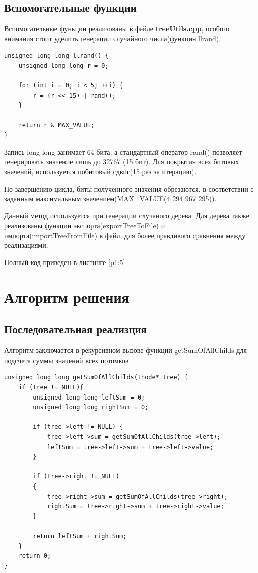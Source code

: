 \subsection{Вспомогательные функции}
Вспомогательные функции реализованы в файле \textbf{treeUtils.cpp}, особого внимания стоит уделить генерации случайного числа(функция llrand).
\begin{lstlisting}[firstnumber=17,language={}, caption=Отрывок TreeUtils.cpp]
unsigned long long llrand() {
	unsigned long long r = 0;

	for (int i = 0; i < 5; ++i) {
		r = (r << 15) | rand(); 
	}

	return r & MAX_VALUE;
}
\end{lstlisting}
Запись long long занимает 64 бита, а стандартный оператор rand() позволяет генерировать значение лишь до 32767 (15 бит). Для покрытия всех битовых значений, используется побитовый сдвиг(15 раз за итерацию).

По завершению цикла, биты полученного значения обрезаются, в соответствии с заданным максимальным значением(MAX\_VALUE(4 294 967 295)).

Данный метод используется при генерации случаного дерева. Для дерева также реализованы функции экспорта(exportTreeToFile) и импорта(importTreeFromFile) в файл, для более правдивого сравнения между реализациями.

Полный код приведен в листинге \ref{p1:5}.




\section{Алгоритм решения}
\subsection{Последовательная реализция}
Алгоритм заключается в рекурсивном вызове функции getSumOfAllChilds для подсчета суммы значений всех потомков.
\begin{lstlisting}[firstnumber=118,language={}, caption=Отрывок TreeUtils.cpp]
unsigned long long getSumOfAllChilds(tnode* tree) {
	if (tree != NULL){
		unsigned long long leftSum = 0;
		unsigned long long rightSum = 0;

		if (tree->left != NULL) {
			tree->left->sum = getSumOfAllChilds(tree->left);
			leftSum = tree->left->sum + tree->left->value;
		}

		if (tree->right != NULL)
		{
			tree->right->sum = getSumOfAllChilds(tree->right);
			rightSum = tree->right->sum + tree->right->value;
		}

		return leftSum + rightSum;
	}
	return 0;
}
\end{lstlisting}
